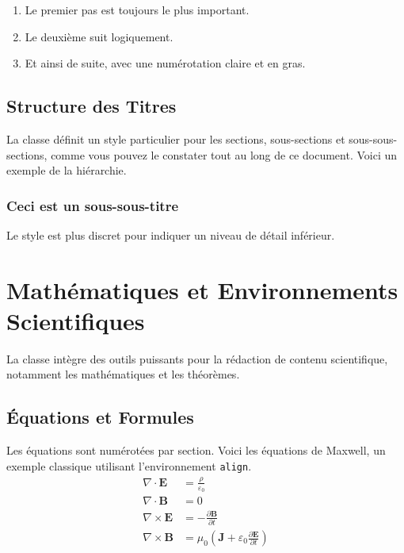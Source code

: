 \documentclass{butexFR}
\begin{document}
\begin{enumerate}
\item Le premier pas est toujours le plus important.
\item Le deuxième suit logiquement.
\item Et ainsi de suite, avec une numérotation claire et en gras.
\end{enumerate}

\subsection{Structure des Titres}
La classe définit un style particulier pour les sections, sous-sections et sous-sous-sections, comme vous pouvez le constater tout au long de ce document. Voici un exemple de la hiérarchie.

\subsubsection{Ceci est un sous-sous-titre}
Le style est plus discret pour indiquer un niveau de détail inférieur.


\section{Mathématiques et Environnements Scientifiques}
La classe intègre des outils puissants pour la rédaction de contenu scientifique, notamment les mathématiques et les théorèmes.

\subsection{Équations et Formules}

Les équations sont numérotées par section. Voici les équations de Maxwell, un exemple classique utilisant l'environnement \texttt{align}.
\begin{align}
\nabla \cdot \mathbf{E} &= \frac{\rho}{\varepsilon_0} \label{eq:maxwell1} \\
\nabla \cdot \mathbf{B} &= 0 \label{eq:maxwell2} \\
\nabla \times \mathbf{E} &= -\frac{\partial \mathbf{B}}{\partial t} \label{eq:maxwell3} \\
\nabla \times \mathbf{B} &= \mu_0 \left( \mathbf{J} + \varepsilon_0 \frac{\partial \mathbf{E}}{\partial t} \right) \label{eq:maxwell4}
\end{align}
\end{document}

